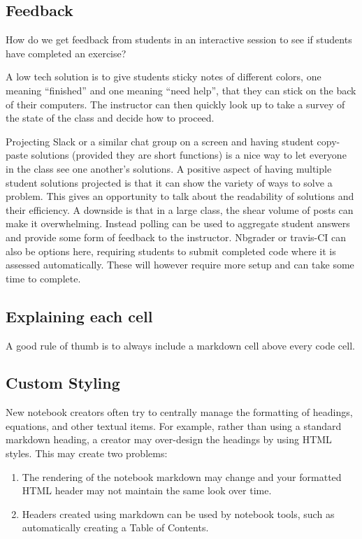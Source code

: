 \documentclass[]{book}
\begin{document}
\subsection{Feedback}\label{feedback}

How do we get feedback from students in an interactive session to see if
students have completed an exercise?

A low tech solution is to give students sticky notes of different
colors, one meaning ``finished'' and one meaning ``need help'', that
they can stick on the back of their computers. The instructor can then
quickly look up to take a survey of the state of the class and decide
how to proceed.

Projecting Slack or a similar chat group on a screen and having student
copy-paste solutions (provided they are short functions) is a nice way
to let everyone in the class see one another's solutions. A positive
aspect of having multiple student solutions projected is that it can
show the variety of ways to solve a problem. This gives an opportunity
to talk about the readability of solutions and their efficiency. A
downside is that in a large class, the shear volume of posts can make it
overwhelming. Instead polling can be used to aggregate student answers
and provide some form of feedback to the instructor. Nbgrader or
travis-CI can also be options here, requiring students to submit
completed code where it is assessed automatically. These will however
require more setup and can take some time to complete.

\subsection{Explaining each cell}\label{explaining-each-cell}

A good rule of thumb is to always include a markdown cell above every
code cell.

\subsection{Custom Styling}\label{custom-styling}

New notebook creators often try to centrally manage the formatting of
headings, equations, and other textual items. For example, rather than
using a standard markdown heading, a creator may over-design the
headings by using HTML styles. This may create two problems:

\begin{enumerate}
\def\labelenumi{\arabic{enumi}.}
\item
  The rendering of the notebook markdown may change and your formatted
  HTML header may not maintain the same look over time.
\item
  Headers created using markdown can be used by notebook tools, such as
  automatically creating a Table of Contents.
\end{enumerate}
\end{document}
